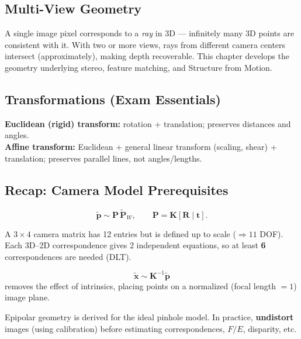 \documentclass[11pt, oneside]{book}
\newcommand{\vct}[1]{\bm{#1}}           %
\newcommand{\mat}[1]{\mathbf{#1}}       %
\begin{document}
\begin{thmbox}[title={Reprojection Error Minimization}]
\begin{defbox}[title={Correlation and Convolution}]
\begin{defbox}[title={ReLU and Pooling}]
\begin{defbox}[title={Segmentation}]
\begin{defbox}[title={Graph-Based Segmentation}]
\begin{defbox}[title={U-Net}]
\begin{defbox}[title={AP and mAP}]
\chapter{Multi-View Geometry}

A single image pixel corresponds to a \emph{ray} in 3D --- infinitely many 3D points are consistent with it.
With two or more views, rays from different camera centers intersect (approximately), making depth recoverable.
This chapter develops the geometry underlying stereo, feature matching, and Structure from Motion.

\section{Transformations (Exam Essentials)}

\begin{notebox}[title={Key Transforms}]
\textbf{Euclidean (rigid) transform:} rotation + translation; preserves distances and angles.\\
\textbf{Affine transform:} Euclidean + general linear transform (scaling, shear) + translation; preserves parallel lines, not angles/lengths.
\end{notebox}

\section{Recap: Camera Model Prerequisites}

\begin{thmbox}[title={Pinhole Camera Model}]
\[
\tilde{\vct{p}} \sim \mat{P}\,\tilde{\vct{P}}_W,
\qquad
\mat{P}=\mat{K}[\mat{R}\mid \vct{t}].
\]
\end{thmbox}

A $3\times 4$ camera matrix has 12 entries but is defined up to scale ($\Rightarrow 11$ DOF).
Each 3D--2D correspondence gives 2 independent equations, so at least \textbf{6} correspondences are needed (DLT).

\begin{defbox}[title={Normalized Image Coordinates}]
\[
\tilde{\vct{x}} \sim \mat{K}^{-1}\tilde{\vct{p}}
\]
removes the effect of intrinsics, placing points on a normalized (focal length $=1$) image plane.
\end{defbox}

Epipolar geometry is derived for the ideal pinhole model. In practice, \textbf{undistort} images (using calibration)
before estimating correspondences, $F/E$, disparity, etc.


\end{defbox}
\end{defbox}
\end{defbox}
\end{defbox}
\end{defbox}
\end{defbox}
\end{thmbox}
\end{document}
